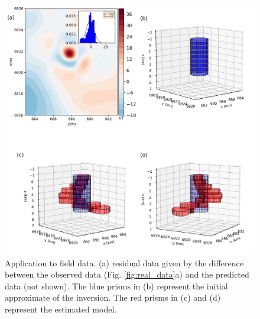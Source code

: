 \begin{figure}
    \centering
    \includegraphics[scale=.5]{figures/anitapolis_results.png}
    \caption{Application to field data. (a) residual data given by the difference between the observed data (Fig. \ref{fig:real_data}a) and the predicted data (not shown). The blue prisms in (b) represent the initial approximate of the inversion. The red prisms in (c) and (d) represent the estimated model. 
}
    \label{fig:real_result}
\end{figure}
